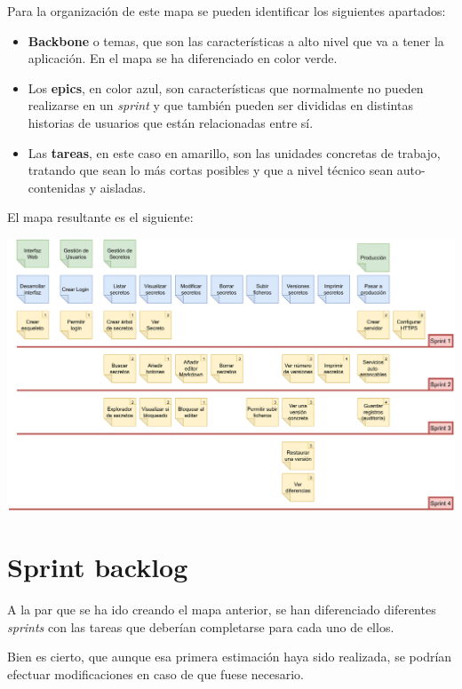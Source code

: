\documentclass{\ClassPath/viu-tfm-template}
\begin{document}
Para la organización de este mapa se pueden identificar los siguientes apartados:
\begin{itemize}
    \item \textbf{Backbone} o temas, que son las características a alto nivel que va a tener la aplicación. En el mapa se ha diferenciado en color verde.
    \item Los \textbf{epics}, en color azul, son características que normalmente no pueden realizarse en un \textit{sprint} y que también pueden ser divididas en distintas historias de usuarios que están relacionadas entre sí.
    \item Las \textbf{tareas}, en este caso en amarillo, son las unidades concretas de trabajo, tratando que sean lo más cortas posibles y que a nivel técnico sean auto-contenidas y aisladas.
\end{itemize}

El mapa resultante es el siguiente:

\begin{center}
    \includegraphics[width=\linewidth]{img/kanban.png}
\end{center}

\section{Sprint backlog}

A la par que se ha ido creando el mapa anterior, se han diferenciado diferentes \textit{sprints} con las tareas que deberían completarse para cada uno de ellos.

Bien es cierto, que aunque esa primera estimación haya sido realizada, se podrían efectuar modificaciones en caso de que fuese necesario.
\end{document}
